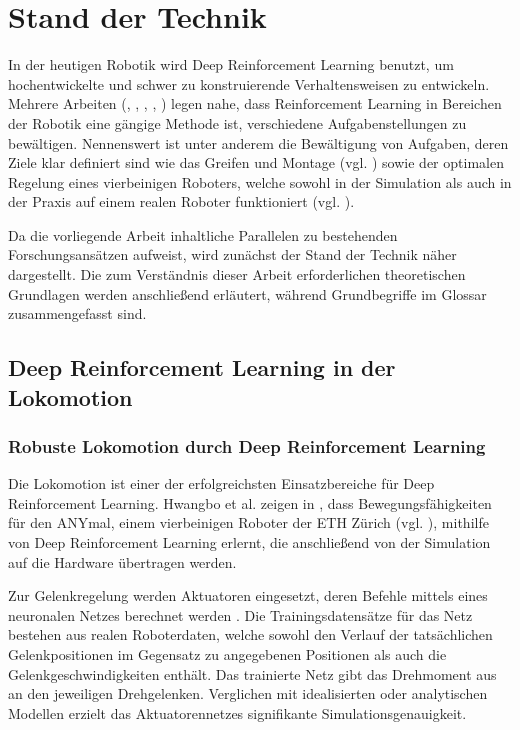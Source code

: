\chapter{Stand der Technik}\label{ch:state_of_the_art}
In der heutigen Robotik wird Deep Reinforcement Learning benutzt, um hochentwickelte und schwer zu konstruierende Verhaltensweisen zu entwickeln. Mehrere Arbeiten (\cite{tangDeepReinforcementLearning2024}, \cite{margolisWalkTheseWays2022}, \cite{heessEmergenceLocomotionBehaviours2017}, \cite{pengLearningLocomotionSkills2017}, \cite{hwangboLearningAgileDynamic2019}) legen nahe, dass Reinforcement Learning in Bereichen der Robotik eine gängige Methode ist, verschiedene Aufgabenstellungen zu bewältigen. Nennenswert ist unter anderem die Bewältigung von Aufgaben, deren Ziele klar definiert sind wie das Greifen und Montage (vgl. \cite{tangDeepReinforcementLearning2024}) sowie der optimalen Regelung eines vierbeinigen Roboters, welche sowohl in der Simulation als auch in der Praxis auf einem realen Roboter funktioniert (vgl. \cite{hwangboLearningAgileDynamic2019}).

Da die vorliegende Arbeit inhaltliche Parallelen zu bestehenden Forschungsansätzen aufweist, wird zunächst der Stand der Technik näher dargestellt. Die zum Verständnis dieser Arbeit erforderlichen theoretischen Grundlagen werden anschließend erläutert, während Grundbegriffe im Glossar zusammengefasst sind. %

\section{Deep Reinforcement Learning in der Lokomotion}
\subsection{Robuste Lokomotion durch Deep Reinforcement Learning}
Die Lokomotion ist einer der erfolgreichsten Einsatzbereiche für Deep Reinforcement Learning. Hwangbo et al. zeigen in \cite{hwangboLearningAgileDynamic2019}, dass Bewegungsfähigkeiten für den ANYmal, einem vierbeinigen Roboter der ETH Zürich (vgl. \cite{hutterANYmalHighlyMobile2016}), mithilfe von Deep Reinforcement Learning erlernt, die anschließend von der Simulation auf die Hardware übertragen werden.

Zur Gelenkregelung werden Aktuatoren eingesetzt, deren Befehle mittels eines neuronalen Netzes berechnet werden \cite{hwangboLearningAgileDynamic2019}. Die Trainingsdatensätze für das Netz bestehen aus realen Roboterdaten, welche sowohl den Verlauf der tatsächlichen Gelenkpositionen im Gegensatz zu angegebenen Positionen als auch die Gelenkgeschwindigkeiten enthält. Das trainierte Netz gibt das Drehmoment aus an den jeweiligen Drehgelenken. Verglichen mit idealisierten oder analytischen Modellen erzielt das Aktuatorennetzes signifikante Simulationsgenauigkeit.


